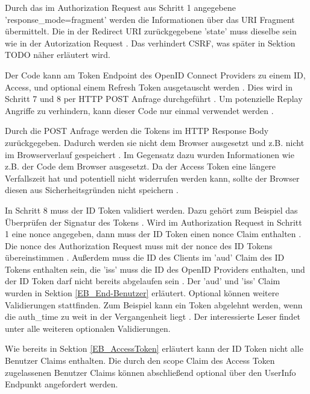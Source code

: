 Durch das im Authorization Request aus Schritt 1 angegebene 'response\_mode=fragment' werden die Informationen über das URI Fragment übermittelt. Die in der Redirect URI zurückgegebene 'state' muss dieselbe sein wie in der Autorization Request \cite{EB20}. Das verhindert CSRF, was später in Sektion TODO näher erläutert wird.


Der Code kann am Token Endpoint des OpenID Connect Providers zu einem ID, Access, und optional einem Refresh Token ausgetauscht werden \cite{EB19}. Dies wird in Schritt 7 und 8 per HTTP POST Anfrage durchgeführt \cite{EB20}. Um potenzielle Replay Angriffe zu verhindern, kann dieser Code nur einmal verwendet werden \cite{EB21}.

Durch die POST Anfrage werden die Tokens im HTTP Response Body zurückgegeben. Dadurch werden sie nicht dem Browser ausgesetzt \cite{EB22} und z.B. nicht im Browserverlauf gespeichert \cite{EB23}. Im Gegensatz dazu wurden Informationen wie z.B. der Code dem Browser ausgesetzt. Da der Access Token eine längere Verfallszeit hat und potentiell nicht widerrufen werden kann, sollte der Browser diesen aus Sicherheitsgründen nicht speichern \cite{EB23}.

In Schritt 8 muss der ID Token validiert werden. Dazu gehört zum Beispiel das Überprüfen der Signatur des Tokens \cite{EB24}. Wird im Authorization Request in Schritt 1 eine nonce angegeben, dann muss der ID Token einen nonce Claim enthalten \cite{EB24}. Die nonce des Authorization Request muss mit der nonce des ID Tokens übereinstimmen \cite{EB24}. Außerdem muss die ID des Clients im 'aud' Claim des ID Tokens enthalten sein, die 'iss' muss die ID des OpenID Providers enthalten, und der ID Token darf nicht bereits abgelaufen sein \cite{EB24}. Der 'aud' und 'iss' Claim wurden in Sektion \ref{EB_End-Benutzer} erläutert. Optional können weitere Validierungen stattfinden. Zum Beispiel kann ein Token abgelehnt werden, wenn die auth\_time zu weit in der Vergangenheit liegt \cite{EB24}. Der interessierte Leser findet unter \cite{EB24} alle weiteren optionalen Validierungen.

Wie bereits in Sektion \ref{EB_AccessToken} erläutert kann der ID Token nicht alle Benutzer Claims enthalten. Die durch den scope Claim des Access Token zugelassenen Benutzer Claims können abschließend optional über den UserInfo Endpunkt angefordert werden.

